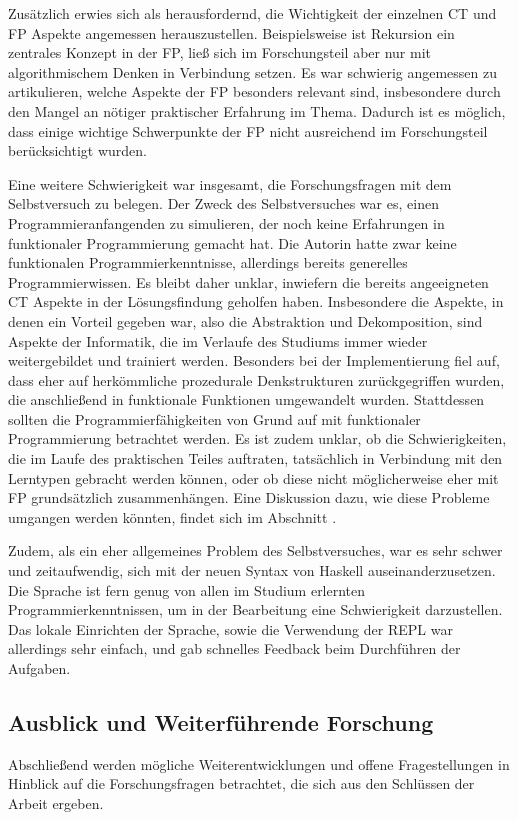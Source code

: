 Zusätzlich erwies sich als herausfordernd, die Wichtigkeit der einzelnen CT und FP Aspekte angemessen herauszustellen. Beispielsweise ist Rekursion ein zentrales Konzept in der FP, ließ sich im Forschungsteil aber nur mit algorithmischem Denken in Verbindung setzen. Es war schwierig angemessen zu artikulieren, welche Aspekte der FP besonders relevant sind, insbesondere durch den Mangel an nötiger praktischer Erfahrung im Thema. Dadurch ist es möglich, dass einige wichtige Schwerpunkte der FP nicht ausreichend im Forschungsteil berücksichtigt wurden.

Eine weitere Schwierigkeit war insgesamt, die Forschungsfragen mit dem Selbstversuch zu belegen. Der Zweck des Selbstversuches war es, einen Programmieranfangenden zu simulieren, der noch keine Erfahrungen in funktionaler Programmierung gemacht hat. Die Autorin hatte zwar keine funktionalen Programmierkenntnisse, allerdings bereits generelles Programmierwissen. Es bleibt daher unklar, inwiefern die bereits angeeigneten CT Aspekte in der Lösungsfindung geholfen haben. Insbesondere die Aspekte, in denen ein Vorteil gegeben war, also die Abstraktion und Dekomposition, sind Aspekte der Informatik, die im Verlaufe des Studiums immer wieder weitergebildet und trainiert werden.
Besonders bei der Implementierung fiel auf, dass eher auf herkömmliche prozedurale Denkstrukturen zurückgegriffen wurden, die anschließend in funktionale Funktionen umgewandelt wurden. Stattdessen sollten die Programmierfähigkeiten von Grund auf mit funktionaler Programmierung betrachtet werden.
Es ist zudem unklar, ob die Schwierigkeiten, die im Laufe des praktischen Teiles auftraten, tatsächlich in Verbindung mit den Lerntypen gebracht werden können, oder ob diese nicht möglicherweise eher mit FP grundsätzlich zusammenhängen.
Eine Diskussion dazu, wie diese Probleme umgangen werden könnten, findet sich im Abschnitt .

Zudem, als ein eher allgemeines Problem des Selbstversuches, war es sehr schwer und zeitaufwendig, sich mit der neuen Syntax von Haskell auseinanderzusetzen. Die Sprache ist fern genug von allen im Studium erlernten Programmierkenntnissen, um in der Bearbeitung eine Schwierigkeit darzustellen.
Das lokale Einrichten der Sprache, sowie die Verwendung der REPL war allerdings sehr einfach, und gab schnelles Feedback beim Durchführen der Aufgaben.

\subsection{Ausblick und Weiterführende Forschung}\label{sec:future}
Abschließend werden mögliche Weiterentwicklungen und offene Fragestellungen in Hinblick auf die Forschungsfragen betrachtet, die sich aus den Schlüssen der Arbeit ergeben.

